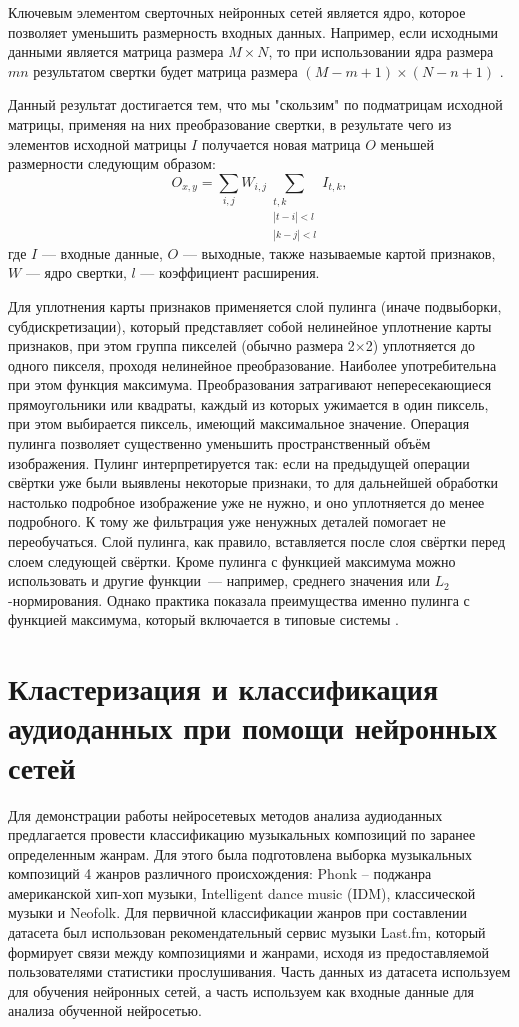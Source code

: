 Ключевым элементом сверточных нейронных сетей является ядро, которое позволяет уменьшить размерность входных данных.
Например, если исходными данными является матрица размера $M\times N$, то при использовании ядра размера $mn$ результатом свертки будет
матрица размера $(M-m+1)\times(N-n+1)$ \cite{cyberbred}.

Данный результат достигается тем, что мы "скользим" по подматрицам исходной матрицы, применяя на них преобразование свертки,
в результате чего из элементов исходной матрицы $I$ получается новая матрица $O$ меньшей размерности следующим образом:
\begin{equation}
	O_{x,y} = \sum_{i,j} W_{i,j} \sum_{\substack{t,k\\\left|t-i\right|<l\\ \left|k-j\right|<l} } I_{t,k},
\end{equation}
где 
$I$ — входные данные, $O$ — выходные, также называемые картой признаков, $W$ — ядро свертки, $l$ — коэффициент расширения. 

Для уплотнения карты признаков применяется слой пулинга (иначе подвыборки, субдискретизации), который представляет собой нелинейное уплотнение карты признаков, при этом группа пикселей (обычно размера 2×2) уплотняется до одного пикселя, проходя нелинейное преобразование. Наиболее употребительна при этом функция максимума. Преобразования затрагивают непересекающиеся прямоугольники или квадраты, каждый из которых ужимается в один пиксель, при этом выбирается пиксель, имеющий максимальное значение. Операция пулинга позволяет существенно уменьшить пространственный объём изображения. Пулинг интерпретируется так: если на предыдущей операции свёртки уже были выявлены некоторые признаки, то для дальнейшей обработки настолько подробное изображение уже не нужно, и оно уплотняется до менее подробного. К тому же фильтрация уже ненужных деталей помогает не переобучаться. Слой пулинга, как правило, вставляется после слоя свёртки перед слоем следующей свёртки.
Кроме пулинга с функцией максимума можно использовать и другие функции — например, среднего значения или $L_2$-нормирования. Однако практика показала преимущества именно пулинга с функцией максимума, который включается в типовые системы \cite{wikiconv}. 

\chapter{Кластеризация и классификация аудиоданных при помощи нейронных сетей}
Для демонстрации работы нейросетевых методов анализа аудиоданных предлагается провести классификацию музыкальных композиций
по заранее определенным жанрам. Для этого была подготовлена выборка музыкальных композиций 4 жанров различного происхождения:
Phonk -- поджанра американской хип-хоп музыки, Intelligent dance music (IDM), классической музыки и Neofolk.
Для первичной классификации жанров при составлении датасета был использован рекомендательный сервис музыки Last.fm, который
формирует связи между композициями и жанрами, исходя из предоставляемой пользователями статистики прослушивания.
Часть данных из датасета используем для обучения нейронных сетей, 
а часть используем как входные данные для анализа обученной нейросетью. 

